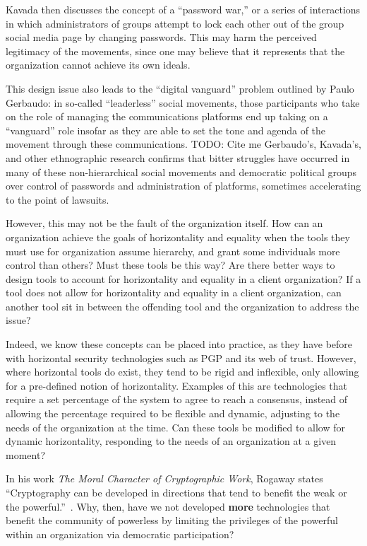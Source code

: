 Kavada then discusses the concept of a ``password war,'' or a series of
interactions in which administrators of groups attempt to lock each other out of
the group social media page by changing passwords. This may harm the perceived
legitimacy of the movements, since one may believe that it represents that the
organization cannot achieve its own ideals.

This design issue also leads to the ``digital vanguard'' problem outlined by
Paulo Gerbaudo: in so-called ``leaderless'' social movements, those participants
who take on the role of managing the communications platforms end up taking on a
``vanguard'' role insofar as they are able to set the tone and agenda of the
movement through these communications.{\color{red} TODO: Cite me} Gerbaudo’s, Kavada's, and other %
ethnographic research confirms that bitter struggles have occurred in many of
these non-hierarchical social movements and democratic political groups over 
control of passwords and administration of platforms, sometimes accelerating to
the point of lawsuits.

However, this may not be the fault of the organization itself. How can an 
organization achieve the goals of horizontality and equality when the tools they
must use for organization assume hierarchy, and grant some individuals more
control than others? Must these tools be this way? Are there better ways to
design tools to account for horizontality and equality in a client organization?
If a tool does not allow for horizontality and equality in a client
organization, can another tool sit in between the offending tool and the
organization to address the issue? 

Indeed, we know these concepts can be placed into practice, as they have before
with horizontal security technologies such as PGP and its web of trust. However,
where horizontal tools do exist, they tend to be rigid and inflexible, only
allowing for a pre-defined notion of horizontality. Examples of this are
technologies that require a set percentage of the system to agree to reach a
consensus, instead of allowing the percentage required to be flexible and
dynamic, adjusting to the needs of the organization at the time. Can these tools
be modified to allow for dynamic horizontality, responding to the needs of an
organization at a given moment?

In his work \textit{The Moral Character of
Cryptographic Work}, Rogaway states ``Cryptography can be developed in
directions that tend to benefit the weak or the
powerful.''~\cite{rogaway2015moral}. Why, then, have we not developed
\textbf{more} technologies that benefit the community of powerless by limiting
the privileges of the powerful within an organization via democratic
participation?

